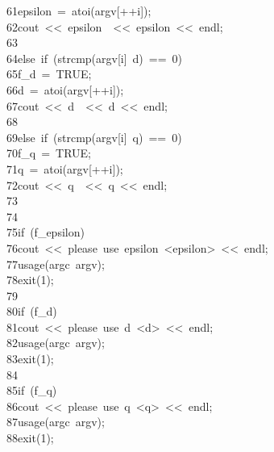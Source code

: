 \begin{tabbing}
61\>\>\>\>epsilon\ =\ atoi(argv[++i]);\\[0pt]
62\>\>\>\>cout\ <<\ epsilon\ \ <<\ epsilon\ <<\ endl;\\[0pt]
63\>\>\>\>\\[0pt]
64\>\>\>else\ if\ (strcmp(argv[i]\ d)\ ==\ 0)\ \\[0pt]
65\>\>\>\>f\_d\ =\ TRUE;\\[0pt]
66\>\>\>\>d\ =\ atoi(argv[++i]);\\[0pt]
67\>\>\>\>cout\ <<\ d\ \ <<\ d\ <<\ endl;\\[0pt]
68\>\>\>\>\\[0pt]
69\>\>\>else\ if\ (strcmp(argv[i]\ q)\ ==\ 0)\ \\[0pt]
70\>\>\>\>f\_q\ =\ TRUE;\\[0pt]
71\>\>\>\>q\ =\ atoi(argv[++i]);\\[0pt]
72\>\>\>\>cout\ <<\ q\ \ <<\ q\ <<\ endl;\\[0pt]
73\>\>\>\>\\[0pt]
74\>\>\>\\[0pt]
75\>\>if\ (f\_epsilon)\ \\[0pt]
76\>\>\>cout\ <<\ please\ use\ epsilon\ <epsilon>\ <<\ endl;\\[0pt]
77\>\>\>usage(argc\ argv);\\[0pt]
78\>\>\>exit(1);\\[0pt]
79\>\>\>\>\\[0pt]
80\>\>if\ (f\_d)\ \\[0pt]
81\>\>\>cout\ <<\ please\ use\ d\ <d>\ <<\ endl;\\[0pt]
82\>\>\>usage(argc\ argv);\\[0pt]
83\>\>\>exit(1);\\[0pt]
84\>\>\>\>\\[0pt]
85\>\>if\ (f\_q)\ \\[0pt]
86\>\>\>cout\ <<\ please\ use\ q\ <q>\ <<\ endl;\\[0pt]
87\>\>\>usage(argc\ argv);\\[0pt]
88\>\>\>exit(1);\\[0pt]

\end{tabbing}
